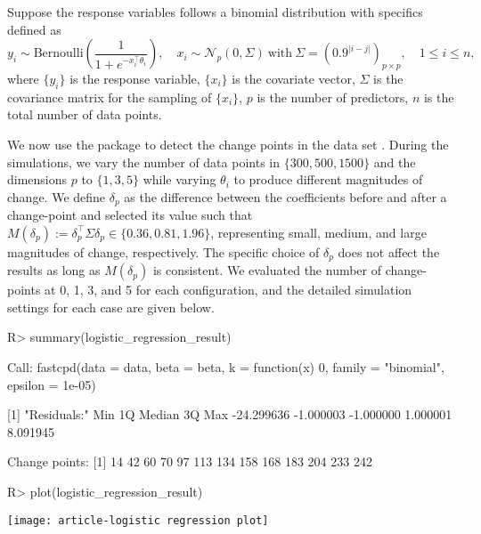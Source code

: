 \documentclass[article]{jss}
\begin{document}
Suppose the response variables follows a binomial distribution with specifics
defined as
%
\begin{equation} \label{eq:logistic_regression}
y_i \sim \mathrm{Bernoulli}\left(\frac{1}{1 + e^{- x_i^\top \theta_i}}\right),
\quad x_i \sim \mathcal{N}_p(0, \Sigma)\ \mathrm{with}\ \Sigma =
(0.9^{\lvert i - j \rvert})_{p \times p}, \quad 1 \le i \le n,
\end{equation}
%
where $\{y_i\}$ is the response variable, $\{x_i\}$ is the covariate vector,
$\Sigma$ is the covariance matrix for the sampling of $\{x_i\}$, $p$ is the
number of predictors, $n$ is the total number of data points.

We now use the  package to detect the change points in the data set
. During the simulations, we vary the number of data points in
$\{300, 500, 1500\}$ and the dimensions $p$ to $\{1, 3, 5\}$ while varying $\theta_i$
to produce different magnitudes of change. We define $\delta_p$ as the difference
between the coefficients before and after a change-point and selected its value
such that $M(\delta_p):=\delta_p^\top \Sigma \delta_p \in \{0.36, 0.81, 1.96\}$,
representing small, medium, and large magnitudes of change, respectively. The
specific choice of $\delta_p$ does not affect the results as long as $M(\delta_p)$
is consistent. We evaluated the number of change-points at 0, 1, 3, and 5 for
each configuration, and the detailed simulation settings for each case are given
below.
%
\begin{Schunk}
\begin{Sinput}
R> summary(logistic_regression_result)
\end{Sinput}
\begin{Soutput}
Call:
fastcpd(data = data, beta = beta, k = function(x) 0, family = "binomial", 
    epsilon = 1e-05)

[1] "Residuals:"
       Min         1Q     Median         3Q        Max 
-24.299636  -1.000003  -1.000000   1.000001   8.091945 

Change points:
 [1]  14  42  60  70  97 113 134 158 168 183 204 233 242
\end{Soutput}
\begin{Sinput}
R> plot(logistic_regression_result)
\end{Sinput}
\end{Schunk}
\texttt{[image: article-logistic regression plot]}
\end{document}
